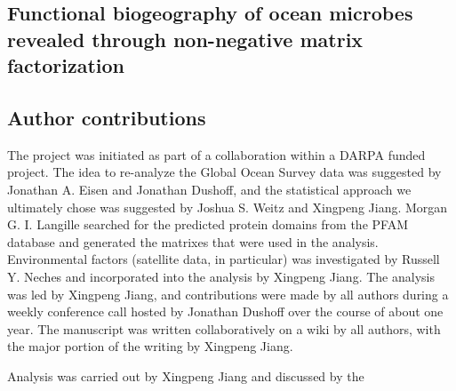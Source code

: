\begin{refsection}
\chapter{Functional biogeography of ocean microbes revealed through non-negative matrix factorization}


\section{Author contributions}

The project was initiated as part of a collaboration within a DARPA funded project. The idea to re-analyze the Global Ocean Survey data was suggested by Jonathan A. Eisen and Jonathan Dushoff, and the statistical approach we ultimately chose was suggested by Joshua S. Weitz and Xingpeng Jiang. Morgan G. I. Langille searched for the predicted protein domains from the PFAM database and generated the matrixes that were used in the analysis. Environmental factors (satellite data, in particular) was investigated by Russell Y. Neches and incorporated into the analysis by Xingpeng Jiang. The analysis was led by Xingpeng Jiang, and contributions were made by all authors during a weekly conference call hosted by Jonathan Dushoff over the course of about one year. The manuscript was written collaboratively on a wiki by all authors, with the major portion of the writing by Xingpeng Jiang.

Analysis was carried out by Xingpeng Jiang and discussed by the 










\printbibliography[heading=subbibliography]



\end{refsection}